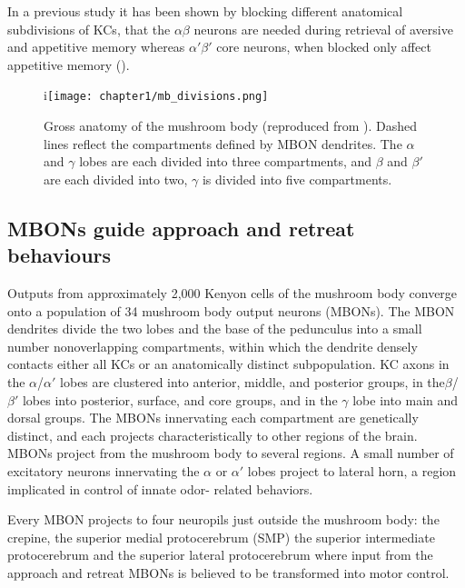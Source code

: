 In a previous study it has been shown by blocking different anatomical
subdivisions of KCs, that the $\alpha\beta$ neurons are needed during
retrieval of aversive and appetitive memory whereas $\alpha'\beta'$
core neurons, when blocked only affect appetitive memory (\citealp{Perisse:2013fp}). 


\begin{figure}[H]
%
i\texttt{[image: chapter1/mb\_divisions.png]}


\caption[Anatomy of the Mushroom BodyAnatomy of the Mushroom Body]{%
}

Gross anatomy of the mushroom body (reproduced from \citealp{Aso:2014bh}).
Dashed lines reflect the compartments defined by MBON dendrites. The
$\alpha$ and $\gamma$ lobes are each divided into three compartments,
and $\beta$ and $\beta'$ are each divided into two, $\gamma$ is
divided into five compartments.%
\end{figure}

\subsection{MBONs guide approach and retreat behaviours}

Outputs from approximately 2,000 Kenyon cells of the mushroom body
converge onto a population of 34 mushroom body output neurons (MBONs).
The MBON dendrites divide the two lobes and the base of the pedunculus
into a small number nonoverlapping compartments, within which the
dendrite densely contacts either all KCs or an anatomically distinct
subpopulation. KC axons in the $\alpha$/$\alpha'$ lobes are clustered
into anterior, middle, and posterior groups, in the$\beta$/$\beta'$
lobes into posterior, surface, and core groups, and in the $\gamma$
lobe into main and dorsal groups. The MBONs innervating each compartment
are genetically distinct, and each projects characteristically to
other regions of the brain. MBONs project from the mushroom body to
several regions. A small number of excitatory neurons innervating
the $\alpha$ or $\alpha'$ lobes project to lateral horn, a region
implicated in control of innate odor- related behaviors.

Every MBON projects to four neuropils just outside the mushroom body:
the crepine, the superior medial protocerebrum (SMP) the superior
intermediate protocerebrum and the superior lateral protocerebrum
where input from the approach and retreat MBONs is believed to be
transformed into motor control. 

